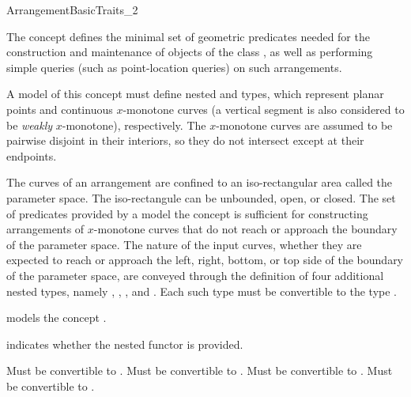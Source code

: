 
\ccRefPageBegin
\begin{ccRefConcept}{ArrangementBasicTraits_2}

\ccDefinition
The concept \ccRefName{} defines the minimal set of geometric
predicates needed for the construction and maintenance of objects of the
class , as well as performing simple queries (such as
point-location queries) on such arrangements.

A model of this concept must define nested  and
 types, which represent planar points and
continuous $x$-monotone curves (a vertical segment is also considered to be
{\sl weakly} $x$-monotone), respectively. The $x$-monotone curves are assumed
to be pairwise disjoint in their interiors, so they do not intersect
except at their endpoints.

The  curves of an arrangement are confined to an
iso-rectangular area called the parameter space. The iso-rectangule can
be unbounded, open, or closed. The set of predicates provided by a model
the concept \ccRefName{} is sufficient for constructing arrangements of
$x$-monotone curves that do not reach or approach the boundary of the
parameter space. The nature of the input curves, whether they are
expected to reach or approach the left, right, bottom, or top side of the
boundary of the parameter space, are conveyed through the definition of
four additional nested types, namely ,
, , and
. Each such type must be convertible to the type
.


\ccTypes
\ccGlue
{}
  {models the concept .}

  {indicates whether the nested functor  is
  provided.} 

  {Must be convertible to .}
  {Must be convertible to .}
  {Must be convertible to .}
  {Must be convertible to .}


\end{ccRefConcept}
